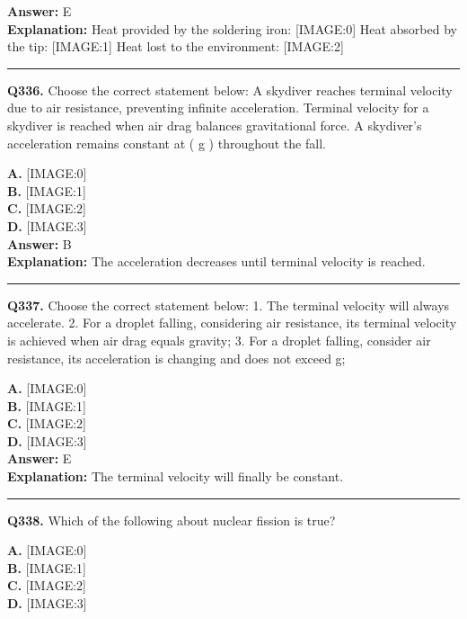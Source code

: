 \documentclass[12pt]{article}
\begin{document}
\textbf{Answer:} E \\
\textbf{Explanation:} Heat provided by the soldering iron:
[IMAGE:0]
Heat absorbed by the tip:
[IMAGE:1]
Heat lost to the environment:
[IMAGE:2]

\hrule
\vspace{1em}


\noindent
\textbf{Q336.} Choose the correct statement below:
A skydiver reaches terminal velocity due to air resistance, preventing infinite acceleration.
Terminal velocity for a skydiver is reached when air drag balances gravitational force.
A skydiver’s acceleration remains constant at ( g ) throughout the fall.



\textbf{A.} [IMAGE:0] \\
\textbf{B.} [IMAGE:1] \\
\textbf{C.} [IMAGE:2] \\
\textbf{D.} [IMAGE:3] \\

\textbf{Answer:} B \\
\textbf{Explanation:} The acceleration decreases until terminal velocity is reached.

\hrule
\vspace{1em}


\noindent
\textbf{Q337.} Choose the correct statement below:
1. The terminal velocity will always accelerate.
2. For a droplet falling, considering air resistance, its terminal velocity is achieved when air drag equals gravity;
3. For a droplet falling, consider air resistance, its acceleration is changing and does not exceed g;



\textbf{A.} [IMAGE:0] \\
\textbf{B.} [IMAGE:1] \\
\textbf{C.} [IMAGE:2] \\
\textbf{D.} [IMAGE:3] \\

\textbf{Answer:} E \\
\textbf{Explanation:} The terminal velocity will finally be constant.

\hrule
\vspace{1em}


\noindent
\textbf{Q338.} Which of the following about nuclear fission is true?



\textbf{A.} [IMAGE:0] \\
\textbf{B.} [IMAGE:1] \\
\textbf{C.} [IMAGE:2] \\
\textbf{D.} [IMAGE:3] \\
\end{document}
